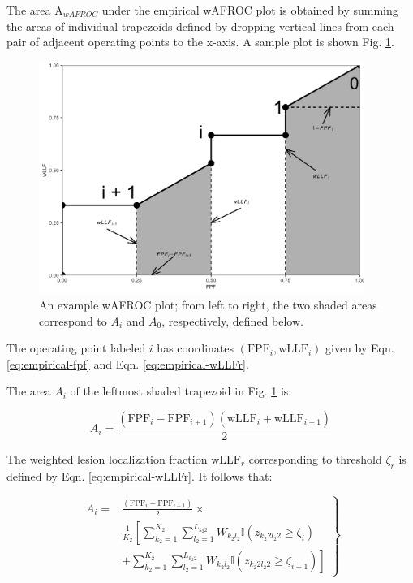 \documentclass[
]{book}
\begin{document}
The area \(\text{A}_{wAFROC}\) under the empirical wAFROC plot is obtained by summing the areas of individual trapezoids defined by dropping vertical lines from each pair of adjacent operating points to the x-axis. A sample plot is shown Fig. \ref{fig:empirical-theorems}.

\begin{figure}

{\centering \includegraphics[width=300pt]{images/03-empiricalPlots/proofFigure} 

}

\caption{An example wAFROC plot; from left to right, the two shaded areas correspond to $A_i$ and  $A_0$, respectively, defined below.}\label{fig:empirical-theorems}
\end{figure}

The operating point labeled \(i\) has coordinates \(\left ( \text{FPF}_i, \text{wLLF}_i \right )\) given by Eqn. \eqref{eq:empirical-fpf} and Eqn. \eqref{eq:empirical-wLLFr}.

The area \(A_i\) of the leftmost shaded trapezoid in Fig. \ref{fig:empirical-theorems} is:

\begin{equation}
A_i = \frac{\left (\text{FPF}_i - \text{FPF}_{i+1}\right )\left (\text{wLLF}_i + \text{wLLF}_{i+1}\right )}{2}
\label{eq:empirical-auc-1}
\end{equation}

The weighted lesion localization fraction \(\text{wLLF}_r\) corresponding to threshold \(\zeta_r\) is defined by Eqn. \eqref{eq:empirical-wLLFr}. It follows that:

\begin{equation}
\left. 
\begin{aligned}
A_i =&  \frac{\left (\text{FPF}_i - \text{FPF}_{i+1}\right )}{2} \times \\ 
& \frac{1}{K_2}\left[ \sum_{k_2=1}^{K_2}\sum_{l_2=1}^{L_{k_2 2}}W_{k_2 l_2} \mathbb{I}\left ( z_{k_2 2 l_2 2} \geq \zeta_i \right ) \right. \\
&+ \left. \sum_{k_2=1}^{K_2}\sum_{l_2=1}^{L_{k_2 2}}W_{k_2 l_2} \mathbb{I}\left ( z_{k_2 2 l_2 2} \geq \zeta_{i+1} \right ) \right]  
\end{aligned}
\right \} 
\label{eq:empirical-theorem2}
\end{equation}
\end{document}
